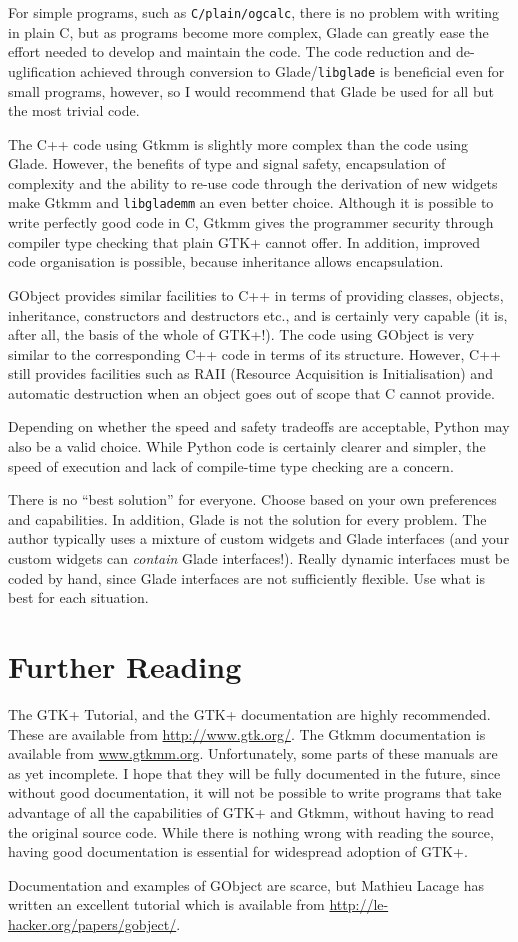 \documentclass[a4paper,oneside]{article}
\newcommand{\program}[1]{\texttt{#1}}
\begin{document}
For simple programs, such as \program{C/plain/ogcalc}, there is no
problem with writing in plain C, but as programs become more complex,
Glade can greatly ease the effort needed to develop and maintain the
code.  The code reduction and de-uglification achieved through
conversion to Glade/\program{libglade} is beneficial even for small
programs, however, so I would recommend that Glade be used for all but
the most trivial code.

The C++ code using Gtkmm is slightly more complex than the code using
Glade.  However, the benefits of type and signal safety, encapsulation
of complexity and the ability to re-use code through the derivation of
new widgets make Gtkmm and \program{libglademm} an even better choice.
Although it is possible to write perfectly good code in C, Gtkmm gives
the programmer security through compiler type checking that plain GTK+
cannot offer.  In addition, improved code organisation is possible,
because inheritance allows encapsulation.

GObject provides similar facilities to C++ in terms of providing
classes, objects, inheritance, constructors and destructors etc., and
is certainly very capable (it is, after all, the basis of the whole of
GTK+!).  The code using GObject is very similar to the corresponding
C++ code in terms of its structure.  However, C++ still provides
facilities such as RAII (Resource Acquisition is Initialisation) and
automatic destruction when an object goes out of scope that C cannot
provide.

Depending on whether the speed and safety tradeoffs are acceptable,
Python may also be a valid choice.  While Python code is certainly
clearer and simpler, the speed of execution and lack of compile-time
type checking are a concern.

There is no ``best solution'' for everyone.  Choose based on your own
preferences and capabilities.  In addition, Glade is not the solution
for every problem.  The author typically uses a mixture of custom
widgets and Glade interfaces (and your custom widgets can
\emph{contain} Glade interfaces!).  Really dynamic interfaces must be
coded by hand, since Glade interfaces are not sufficiently flexible.
Use what is best for each situation.


\section{Further Reading}

The GTK+ Tutorial, and the GTK+ documentation are highly recommended.
These are available from \url{http://www.gtk.org/}.  The Gtkmm
documentation is available from \url{www.gtkmm.org}.  Unfortunately,
some parts of these manuals are as yet incomplete.  I hope that they
will be fully documented in the future, since without good
documentation, it will not be possible to write programs that take
advantage of all the capabilities of GTK+ and Gtkmm, without having to
read the original source code.  While there is nothing wrong with
reading the source, having good documentation is essential for
widespread adoption of GTK+.

Documentation and examples of GObject are scarce, but Mathieu Lacage
has written an excellent tutorial which is available from
\url{http://le-hacker.org/papers/gobject/}.
\end{document}
